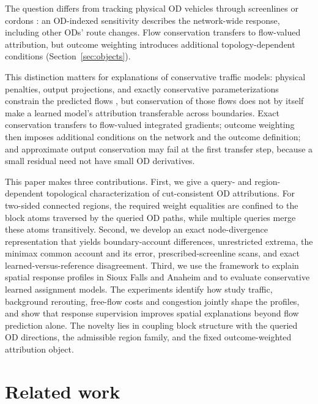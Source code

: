 \documentclass[a4paper,fleqn]{cas-sc}
\begin{document}
The question differs from tracking physical OD vehicles through screenlines
or cordons \citep{sheffi1985urban,vanzuylen1980most,bar2002origin}:
an OD-indexed sensitivity describes the network-wide response,
including other ODs' route changes. Flow conservation transfers to
flow-valued attribution, but outcome weighting introduces additional
topology-dependent conditions (Section~\ref{sec:objects}).

This distinction matters for explanations of conservative traffic
models: physical penalties, output projections, and exactly
conservative parameterizations constrain the predicted flows
\citep{raissi2019physics,shi2021physics,valente2025physics,richterpowell2022neural},
but conservation of those flows does not by itself make a learned
model's attribution transferable across boundaries. Exact
conservation transfers to flow-valued integrated gradients; outcome
weighting then imposes additional conditions on the network and the
outcome definition; and approximate output conservation may fail at
the first transfer step, because a small residual need not have small
OD derivatives.

This paper makes three contributions. First, we give a query- and
region-dependent topological characterization of cut-consistent OD
attributions. For two-sided connected regions, the required weight
equalities are confined to the block atoms traversed by the queried OD
paths, while multiple queries merge these atoms transitively. Second,
we develop an exact node-divergence representation that yields
boundary-account differences, unrestricted extrema, the minimax common
account and its error, prescribed-screenline scans, and exact
learned-versus-reference disagreement. Third, we use the framework to
explain spatial response profiles in Sioux Falls and Anaheim and to
evaluate conservative learned assignment models. The experiments
identify how study traffic, background rerouting, free-flow costs and
congestion jointly shape the profiles, and show that response
supervision improves spatial explanations beyond flow prediction
alone. The novelty lies in coupling block structure with the queried
OD directions, the admissible region family, and the fixed
outcome-weighted attribution object.

\section{Related work}\label{sec:related}
\end{document}
